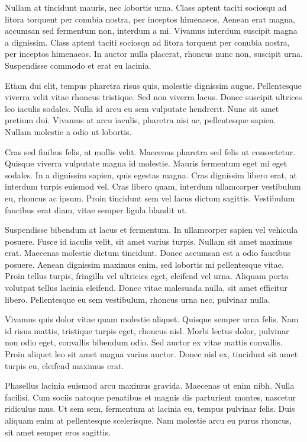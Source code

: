 \documentclass[11pt,]{article}
\begin{document}
Nullam at tincidunt mauris, nec lobortis urna. Class aptent taciti
sociosqu ad litora torquent per conubia nostra, per inceptos himenaeos.
Aenean erat magna, accumsan sed fermentum non, interdum a mi. Vivamus
interdum suscipit magna a dignissim. Class aptent taciti sociosqu ad
litora torquent per conubia nostra, per inceptos himenaeos. In auctor
nulla placerat, rhoncus nunc non, suscipit urna. Suspendisse commodo et
erat eu lacinia.

Etiam dui elit, tempus pharetra risus quis, molestie dignissim augue.
Pellentesque viverra velit vitae rhoncus tristique. Sed non viverra
lacus. Donec suscipit ultrices leo iaculis sodales. Nulla id arcu eu sem
vulputate hendrerit. Nunc sit amet pretium dui. Vivamus at arcu iaculis,
pharetra nisi ac, pellentesque sapien. Nullam molestie a odio ut
lobortis.

Cras sed finibus felis, at mollis velit. Maecenas pharetra sed felis ut
consectetur. Quisque viverra vulputate magna id molestie. Mauris
fermentum eget mi eget sodales. In a dignissim sapien, quis egestas
magna. Cras dignissim libero erat, at interdum turpis euismod vel. Cras
libero quam, interdum ullamcorper vestibulum eu, rhoncus ac ipsum. Proin
tincidunt sem vel lacus dictum sagittis. Vestibulum faucibus erat diam,
vitae semper ligula blandit ut.

Suspendisse bibendum at lacus et fermentum. In ullamcorper sapien vel
vehicula posuere. Fusce id iaculis velit, sit amet varius turpis. Nullam
sit amet maximus erat. Maecenas molestie dictum tincidunt. Donec
accumsan est a odio faucibus posuere. Aenean dignissim maximus enim, sed
lobortis mi pellentesque vitae. Proin tellus turpis, fringilla vel
ultricies eget, eleifend vel urna. Aliquam porta volutpat tellus lacinia
eleifend. Donec vitae malesuada nulla, sit amet efficitur libero.
Pellentesque eu sem vestibulum, rhoncus urna nec, pulvinar nulla.

Vivamus quis dolor vitae quam molestie aliquet. Quisque semper urna
felis. Nam id risus mattis, tristique turpis eget, rhoncus nisl. Morbi
lectus dolor, pulvinar non odio eget, convallis bibendum odio. Sed
auctor ex vitae mattis convallis. Proin aliquet leo sit amet magna
varius auctor. Donec nisl ex, tincidunt sit amet turpis eu, eleifend
maximus erat.

Phasellus lacinia euismod arcu maximus gravida. Maecenas ut enim nibh.
Nulla facilisi. Cum sociis natoque penatibus et magnis dis parturient
montes, nascetur ridiculus mus. Ut sem sem, fermentum at lacinia eu,
tempus pulvinar felis. Duis aliquam enim at pellentesque scelerisque.
Nam molestie arcu eu purus rhoncus, sit amet semper eros sagittis.
\end{document}
